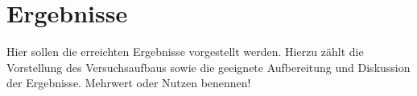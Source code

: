 
\chapter{Ergebnisse}
  \label{Ergebnisse}

Hier sollen die erreichten Ergebnisse vorgestellt werden. Hierzu zählt die Vorstellung des Versuchsaufbaus sowie die geeignete Aufbereitung und Diskussion der Ergebnisse. Mehrwert oder Nutzen benennen!

